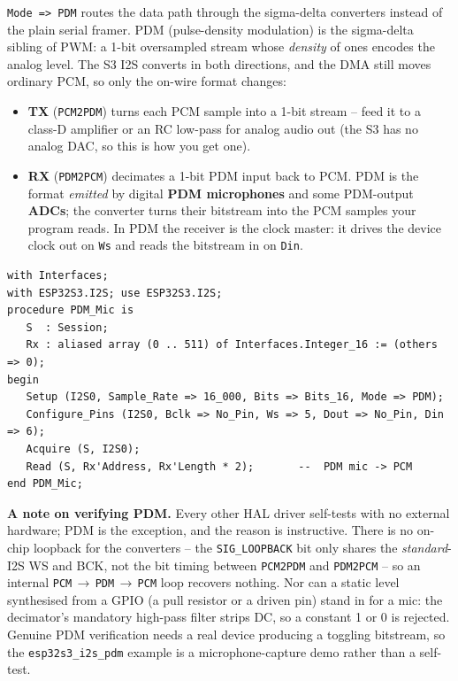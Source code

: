 \texttt{Mode => PDM} routes the data path through the sigma-delta converters
instead of the plain serial framer. PDM (pulse-density modulation) is the
sigma-delta sibling of PWM: a 1-bit oversampled stream whose \emph{density} of
ones encodes the analog level. The S3 I2S converts in both directions, and the
DMA still moves ordinary PCM, so only the on-wire format changes:

\begin{itemize}
  \item \textbf{TX} (\texttt{PCM2PDM}) turns each PCM sample into a 1-bit stream
        -- feed it to a class-D amplifier or an RC low-pass for analog audio out
        (the S3 has no analog DAC, so this is how you get one).
  \item \textbf{RX} (\texttt{PDM2PCM}) decimates a 1-bit PDM input back to PCM.
        PDM is the format \emph{emitted} by digital \textbf{PDM microphones} and
        some PDM-output \textbf{ADCs}; the converter turns their bitstream into the
        PCM samples your program reads. In PDM the receiver is the clock master:
        it drives the device clock out on \texttt{Ws} and reads the bitstream in on
        \texttt{Din}.
\end{itemize}

\begin{lstlisting}
with Interfaces;
with ESP32S3.I2S; use ESP32S3.I2S;
procedure PDM_Mic is
   S  : Session;
   Rx : aliased array (0 .. 511) of Interfaces.Integer_16 := (others => 0);
begin
   Setup (I2S0, Sample_Rate => 16_000, Bits => Bits_16, Mode => PDM);
   Configure_Pins (I2S0, Bclk => No_Pin, Ws => 5, Dout => No_Pin, Din => 6);
   Acquire (S, I2S0);
   Read (S, Rx'Address, Rx'Length * 2);       --  PDM mic -> PCM
end PDM_Mic;
\end{lstlisting}

\textbf{A note on verifying PDM.} Every other HAL driver self-tests with no
external hardware; PDM is the exception, and the reason is instructive. There is
no on-chip loopback for the converters -- the \texttt{SIG\_LOOPBACK} bit only
shares the \emph{standard}-I2S WS and BCK, not the bit timing between
\texttt{PCM2PDM} and \texttt{PDM2PCM} -- so an internal
\texttt{PCM}\,$\rightarrow$\,\texttt{PDM}\,$\rightarrow$\,\texttt{PCM} loop
recovers nothing. Nor can a static level
synthesised from a GPIO (a pull resistor or a driven pin) stand in for a mic: the
decimator's mandatory high-pass filter strips DC, so a constant 1 or 0 is rejected.
Genuine PDM verification needs a real device producing a toggling bitstream, so
the \texttt{esp32s3\_i2s\_pdm} example is a microphone-capture demo rather than a
self-test.

